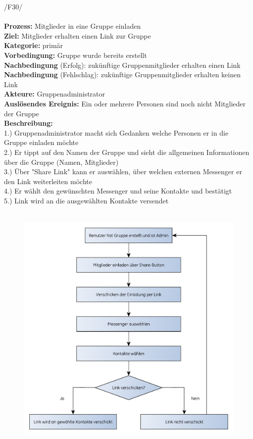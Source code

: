 /F30/ \\ \\
\textbf{Prozess:} Mitglieder in eine Gruppe einladen\\
\textbf{Ziel:} Mitglieder erhalten einen Link zur Gruppe\\
\textbf{Kategorie:} primär\\
\textbf{Vorbedingung:} Gruppe wurde bereits erstellt\\
\textbf{Nachbedingung} (Erfolg): zukünftige Gruppenmitglieder erhalten einen Link\\
\textbf{Nachbedingung} (Fehlschlag): zukünftige Gruppenmitglieder erhalten keinen Link\\
\textbf{Akteure:} Gruppenadministrator\\
\textbf{Auslösendes Ereignis:} Ein oder mehrere Personen sind noch nicht Mitglieder der Gruppe\\
\textbf{Beschreibung:}\\
1.) Gruppenadministrator macht sich Gedanken welche Personen er in die Gruppe einladen möchte\\
2.) Er tippt auf den Namen der Gruppe und sieht die allgemeinen Informationen über die Gruppe (Namen, Mitglieder)\\
3.) Über "Share Link" kann er auswählen, über welchen externen Messenger er den Link weiterleiten möchte\\
4.) Er wählt den gewünschten Messenger und seine Kontakte und bestätigt\\
5.) Link wird an die ausgewählten Kontakte versendet\\ 
\\

\begin{figure} [H]
	\centering
	\includegraphics[scale=0.7]{./res/F30_mitglieder_einladen_flowgraph.pdf}
\end{figure}

